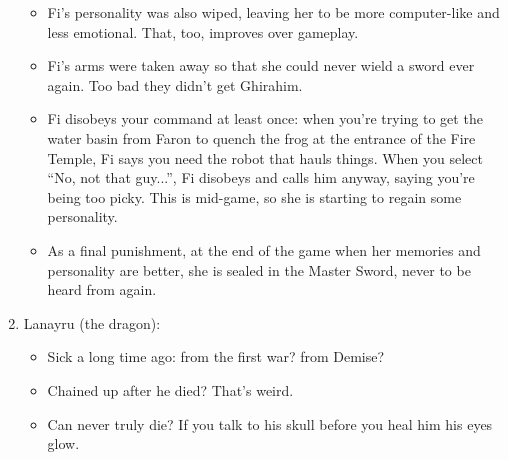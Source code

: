 \begin{enumerate}
{\begin{itemize}
			\item{Fi's personality was also wiped, leaving her to be more computer-like and less emotional. That, too, improves over gameplay.}
			\item{Fi's arms were taken away so that she could never wield a sword ever again. Too bad they didn't get Ghirahim.}
			\item{Fi disobeys your command at least once: when you're trying to get the water basin from Faron to quench the frog at the entrance of the Fire Temple, Fi says you need the robot that hauls things. When you select ``No, not that guy...'', Fi disobeys and calls him anyway, saying you're being too picky. This is mid-game, so she is starting to regain some personality.}
			\item{As a final punishment, at the end of the game when her memories and personality are better, she is sealed in the Master Sword, never to be heard from again.}
		\end{itemize}
	}
	\item{Lanayru (the dragon):
		\begin{itemize}
			\item{Sick a long time ago: from the first war? from Demise?}
			\item{Chained up after he died? That's weird.}
			\item{Can never truly die? If you talk to his skull before you heal him his eyes glow.}
		\end{itemize}
		}
		

\end{enumerate}
